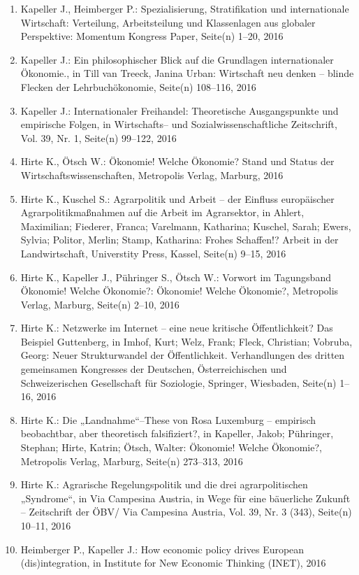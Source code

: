 \begin{enumerate}
	 \item Kapeller J., Heimberger P.: Spezialisierung, Stratifikation und internationale Wirtschaft: Verteilung, Arbeitsteilung und Klassenlagen aus globaler Perspektive: Momentum Kongress Paper, Seite(n) 1--20, 2016
	 \item Kapeller J.: Ein philosophischer Blick auf die Grundlagen internationaler Ökonomie., in Till van Treeck, Janina Urban: Wirtschaft neu denken – blinde Flecken der Lehrbuchökonomie, Seite(n) 108--116, 2016
	 \item Kapeller J.: Internationaler Freihandel: Theoretische Ausgangspunkte und empirische Folgen, in Wirtschafts-- und Sozialwissenschaftliche Zeitschrift, Vol. 39, Nr. 1, Seite(n) 99--122, 2016
	 \item Hirte K., Ötsch W.: Ökonomie! Welche Ökonomie? Stand und Status der Wirtschaftswissenschaften, Metropolis Verlag, Marburg, 2016
	 \item Hirte K., Kuschel S.: Agrarpolitik und Arbeit – der Einfluss europäischer Agrarpolitikmaßnahmen auf die Arbeit im Agrarsektor, in Ahlert, Maximilian; Fiederer, Franca; Varelmann, Katharina; Kuschel, Sarah; Ewers, Sylvia; Politor, Merlin; Stamp, Katharina: Frohes Schaffen!? Arbeit in der Landwirtschaft, Universtity Press, Kassel, Seite(n) 9--15, 2016
	 \item Hirte K., Kapeller J., Pühringer S., Ötsch W.: Vorwort im Tagungsband Ökonomie! Welche Ökonomie?: Ökonomie! Welche Ökonomie?, Metropolis Verlag, Marburg, Seite(n) 2--10, 2016
	 \item Hirte K.: Netzwerke im Internet – eine neue kritische Öffentlichkeit? Das Beispiel Guttenberg, in Imhof, Kurt; Welz, Frank; Fleck, Christian; Vobruba, Georg: Neuer Strukturwandel der Öffentlichkeit. Verhandlungen des dritten gemeinsamen Kongresses der Deutschen, Österreichischen und Schweizerischen Gesellschaft für Soziologie, Springer, Wiesbaden, Seite(n) 1--16, 2016
	 \item Hirte K.: Die „Landnahme“--These von Rosa Luxemburg – empirisch beobachtbar, aber theoretisch falsifiziert?, in Kapeller, Jakob; Pühringer, Stephan; Hirte, Katrin; Ötsch, Walter: Ökonomie! Welche Ökonomie?, Metropolis Verlag, Marburg, Seite(n) 273--313, 2016
	 \item Hirte K.: Agrarische Regelungspolitik und die drei agrarpolitischen „Syndrome“, in Via Campesina Austria, in Wege für eine bäuerliche Zukunft – Zeitschrift der ÖBV/ Via Campesina Austria, Vol. 39, Nr. 3 (343), Seite(n) 10--11, 2016
	 \item Heimberger P., Kapeller J.: How economic policy drives European (dis)integration, in Institute for New Economic Thinking (INET), 2016

\end{enumerate}
